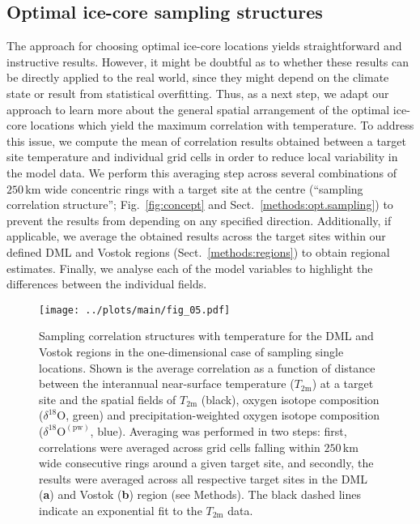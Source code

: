 \documentclass[cp, manuscript]{copernicus}
\begin{document}
\subsection{Optimal ice-core sampling structures}
\label{results:optim-spacing}

The approach for choosing optimal ice-core locations yields straightforward and
instructive results. However, it might be doubtful as to whether these results
can be directly applied to the real world, since they might depend on the
climate state or result from statistical overfitting. Thus, as a next step, we
adapt our approach to learn more about the general spatial arrangement of the
optimal ice-core locations which yield the maximum correlation with
temperature. To address this issue, we compute the mean of correlation results
obtained between a target site temperature and individual grid cells in order to
reduce local variability in the model data. We perform this averaging step
across several combinations of $250$\,km wide concentric rings with a target
site at the centre (``sampling correlation structure''; Fig.~\ref{fig:concept}
and Sect.~\ref{methods:opt.sampling}) to prevent the results from depending on
any specified direction. Additionally, if applicable, we average the obtained
results across the target sites within our defined DML and Vostok regions
(Sect.~\ref{methods:regions}) to obtain regional estimates. Finally, we analyse
each of the model variables to highlight the differences between the individual
fields.

\begin{figure*}[t]%
\centering
\texttt{[image: ../plots/main/fig\_05.pdf]}
\caption{%
  Sampling correlation structures with temperature for the DML and Vostok
  regions in the one-dimensional case of sampling single locations. Shown is the
  average correlation as a function of distance between the interannual
  near-surface temperature ($T_{2\mathrm{m}}$) at a target site and the spatial
  fields of $T_{2\mathrm{m}}$ (black), oxygen isotope composition
  ($\delta^{18}\mathrm{O}$, green) and precipitation-weighted oxygen isotope
  composition ($\delta^{18}\mathrm{O}^{\mathrm{(pw)}}$, blue). Averaging was
  performed in two steps: first, correlations were averaged across grid cells
  falling within $250$\,km wide consecutive rings around a given target site,
  and secondly, the results were averaged across all respective target sites in
  the DML (\textbf{a}) and Vostok (\textbf{b}) region (see Methods). The black
  dashed lines indicate an exponential fit to the $T_{2\mathrm{m}}$ data.}
\label{fig:avg.cor.structure}%
\end{figure*}%
\end{document}
